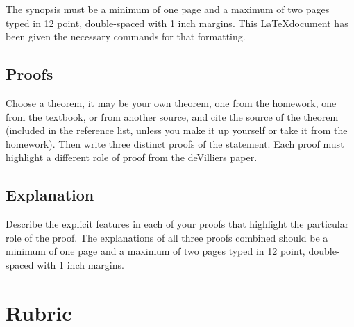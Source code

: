 \documentclass[12pt]{article}
\begin{document}
The synopsis must be a minimum of one page and a maximum of two pages typed in 12 point, double-spaced with 1 inch margins. This \LaTeX document has been given the necessary commands for that formatting.


\subsection{Proofs}
Choose a theorem, it may be your own theorem, one from the homework, one from the textbook, or from another source, and cite the source of the theorem (included in the reference list, unless you make it up yourself or take it from the homework). Then write three distinct proofs of the statement. Each proof must highlight a different role of proof from the deVilliers paper.


\subsection{Explanation}
Describe the explicit features in each of your proofs that highlight the particular role of the proof.  The explanations of all three proofs combined should be a minimum of one page and a  maximum of two pages typed in 12 point, double-spaced with 1 inch margins. 


\section{Rubric}
\end{document}
